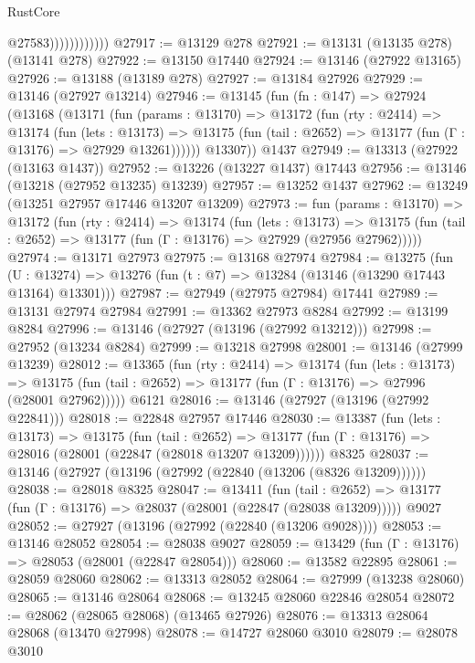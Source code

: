 \begin{lexlean}{RustCore}
\begin{coremodule}
                            @27583))))))))))))
@27917 := @13129 @278
@27921 := @13131 (@13135 @278) (@13141 @278)
@27922 := @13150 @17440
@27924 := @13146 (@27922 @13165)
@27926 := @13188 (@13189 @278)
@27927 := @13184 @27926
@27929 := @13146 (@27927 @13214)
@27946 := @13145
    (fun (fn : @147) =>
    @27924
      (@13168
        (@13171
          (fun (params : @13170) =>
          @13172
            (fun (rty : @2414) =>
            @13174
              (fun (lets : @13173) =>
              @13175 (fun (tail : @2652) => @13177 (fun (Γ : @13176) => @27929 @13261))))))
        @13307))
    @1437
@27949 := @13313 (@27922 (@13163 @1437))
@27952 := @13226 (@13227 @1437) @17443
@27956 := @13146 (@13218 (@27952 @13235) @13239)
@27957 := @13252 @1437
@27962 := @13249 (@13251 @27957 @17446 @13207 @13209)
@27973 := fun (params : @13170) =>
  @13172
    (fun (rty : @2414) =>
    @13174
      (fun (lets : @13173) =>
      @13175 (fun (tail : @2652) => @13177 (fun (Γ : @13176) => @27929 (@27956 @27962)))))
@27974 := @13171 @27973
@27975 := @13168 @27974
@27984 := @13275
    (fun (U : @13274) => @13276 (fun (t : @7) => @13284 (@13146 (@13290 @17443 @13164) @13301)))
@27987 := @27949 (@27975 @27984) @17441
@27989 := @13131 @27974 @27984
@27991 := @13362 @27973 @8284
@27992 := @13199 @8284
@27996 := @13146 (@27927 (@13196 (@27992 @13212)))
@27998 := @27952 (@13234 @8284)
@27999 := @13218 @27998
@28001 := @13146 (@27999 @13239)
@28012 := @13365
    (fun (rty : @2414) =>
    @13174
      (fun (lets : @13173) =>
      @13175 (fun (tail : @2652) => @13177 (fun (Γ : @13176) => @27996 (@28001 @27962)))))
    @6121
@28016 := @13146 (@27927 (@13196 (@27992 @22841)))
@28018 := @22848 @27957 @17446
@28030 := @13387
    (fun (lets : @13173) =>
    @13175
      (fun (tail : @2652) =>
      @13177 (fun (Γ : @13176) => @28016 (@28001 (@22847 (@28018 @13207 @13209))))))
    @8325
@28037 := @13146 (@27927 (@13196 (@27992 (@22840 (@13206 (@8326 @13209))))))
@28038 := @28018 @8325
@28047 := @13411
    (fun (tail : @2652) => @13177 (fun (Γ : @13176) => @28037 (@28001 (@22847 (@28038 @13209)))))
    @9027
@28052 := @27927 (@13196 (@27992 (@22840 (@13206 @9028))))
@28053 := @13146 @28052
@28054 := @28038 @9027
@28059 := @13429 (fun (Γ : @13176) => @28053 (@28001 (@22847 @28054)))
@28060 := @13582 @22895
@28061 := @28059 @28060
@28062 := @13313 @28052
@28064 := @27999 (@13238 @28060)
@28065 := @13146 @28064
@28068 := @13245 @28060 @22846 @28054
@28072 := @28062 (@28065 @28068) (@13465 @27926)
@28076 := @13313 @28064 @28068 (@13470 @27998)
@28078 := @14727 @28060 @3010
@28079 := @28078 @3010

\end{coremodule}
\end{lexlean}
